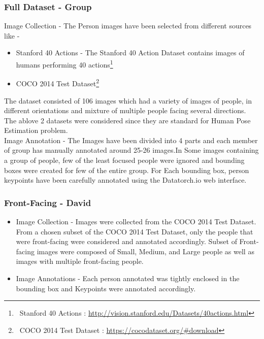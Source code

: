 \documentclass[a4paper,12pt]{article}
\begin{document}
\subsubsection{Full Dataset - Group}
Image Collection - The Person images have been selected from different sources like - 
\begin{itemize}
    \item Stanford 40 Actions - The Stanford 40 Action Dataset contains images of humans performing 40 actions\footnote{\ Stanford 40 Actions : \url{http://vision.stanford.edu/Datasets/40actions.html}}
    \item COCO 2014 Test Dataset\footnote{\ COCO 2014 Test Dataset : \url{https://cocodataset.org/#download}}
\end{itemize}
The dataset consisted of 106 images which had a variety of images of people, in different orientations and mixture of multiple people facing several directions. The ablove 2 datasets were considered since they are standard for Human Pose Estimation problem.
\\
Image Annotation - The Images have been divided into 4 parts and each member of group has manually annotated around 25-26 images.In Some images containing a group of people, few of the least focused people were ignored and bounding boxes were created for few of the entire group. For Each bounding box, person keypoints have been carefully annotated using the Datatorch.io web interface.


\subsubsection{Front-Facing - David}

\begin{itemize}
    \item Image Collection - Images were collected from the COCO 2014 Test Dataset. From a chosen subset of the COCO 2014 Test Dataset\autocite{DBLP:journals/corr/LinMBHPRDZ14}, only the people that were front-facing were considered and annotated accordingly. Subset of Front-facing images were composed of Small, Medium, and Large people as well as images with multiple front-facing people.
    \item Image Annotations - Each person annotated was tightly enclosed in the bounding box and Keypoints were annotated accordingly.
\end{itemize}
\end{document}
